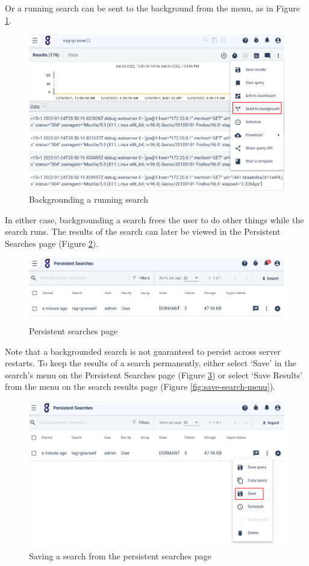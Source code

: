 Or a running search can be sent to the background from the menu, as in Figure \ref{fig:bg-existing-search}.

\begin{figure}
	\includegraphics[width=0.8\linewidth]{images/bg-existing-search.png}
	\caption{Backgrounding a running search}
	\label{fig:bg-existing-search}
\end{figure}

In either case, backgrounding a search frees the user to do other
things while the search runs. The results of the search can later be
viewed in the Persistent Searches page (Figure \ref{fig:persistent-searches}).

\begin{figure}
	\includegraphics[width=0.8\linewidth]{images/persistent-searches.png}
	\caption{Persistent searches page}
	\label{fig:persistent-searches}
\end{figure}

Note that a backgrounded search is not guaranteed to persist across
server restarts. To keep the results of a search permanently, either
select `Save' in the search's menu on the Persistent Searches page (Figure \ref{fig:save-search}) or select `Save Results' from the menu on the search results page (Figure \ref{fig:save-search-menu}).

\begin{figure}
	\includegraphics[width=0.8\linewidth]{images/save-search.png}
	\caption{Saving a search from the persistent searches page}
	\label{fig:save-search}
\end{figure}


